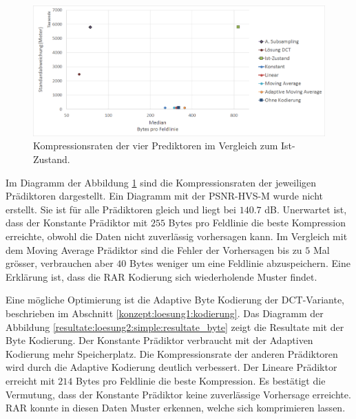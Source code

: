 \begin{figure}[!htbp]
	\center
	\includegraphics[width=1\textwidth,keepaspectratio]{./pictures/resultate/loesung2/variante0/resultate.png}
	\caption{Kompressionsraten der vier Prediktoren im Vergleich zum Ist-Zustand.}
	\label{resultate:loesung2:simple:resultate}
\end{figure}
Im Diagramm der Abbildung \ref{resultate:loesung2:simple:resultate} sind die Kompressionsraten der jeweiligen Prädiktoren dargestellt. Ein Diagramm mit der PSNR-HVS-M wurde nicht erstellt. Sie ist für alle Prädiktoren gleich und liegt bei $140.7$ dB. Unerwartet ist, dass der Konstante Prädiktor mit $255$ Bytes pro Feldlinie die beste Kompression erreichte, obwohl die Daten nicht zuverlässig vorhersagen kann. Im Vergleich mit dem Moving Average Prädiktor sind die Fehler der Vorhersagen 
bis zu $5$ Mal grösser, verbrauchen aber $40$ Bytes weniger um eine Feldlinie abzuspeichern. Eine Erklärung ist, dass die RAR Kodierung sich wiederholende Muster findet.

Eine mögliche Optimierung ist die Adaptive Byte Kodierung der DCT-Variante, beschrieben im Abschnitt \ref{konzept:loesung1:kodierung}. Das Diagramm der Abbildung \ref{resultate:loesung2:simple:resultate_byte} zeigt die Resultate mit der Byte Kodierung. Der Konstante Prädiktor verbraucht mit der Adaptiven Kodierung mehr Speicherplatz. Die Kompressionsrate der anderen Prädiktoren wird durch die Adaptive Kodierung deutlich verbessert. Der Lineare Prädiktor erreicht mit $214$ Bytes pro Feldlinie die beste Kompression. Es bestätigt die Vermutung, dass der Konstante Prädiktor keine zuverlässige Vorhersage erreichte. RAR konnte in diesen Daten Muster erkennen, welche sich komprimieren lassen.

